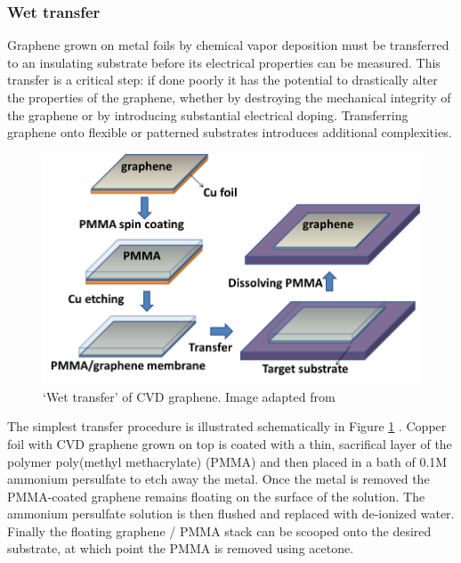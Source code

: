 \documentclass[edeposit,fullpage,draftthesis]{uiucthesis2009}
\begin{document}
            \subsubsection{Wet transfer}
            
            Graphene grown on metal foils by chemical vapor deposition must be transferred to 
        an insulating substrate before its electrical properties can be measured.
        This transfer is a critical step: if done poorly it has the potential to 
        drastically alter the properties of the graphene, whether by destroying
        the mechanical integrity of the graphene or by introducing substantial electrical doping.
        Transferring graphene onto flexible or patterned substrates introduces additional
        complexities. 
        
        \begin{figure}
            \centering
            \includegraphics[width=0.8\linewidth]{images/experimentaltechniques/wettransfer.png}
            \caption[Mechanical exfoliation of graphene]{
                `Wet transfer' of CVD graphene.
                Image adapted from \cite{kumar2013synthesis}}
            \label{fig:wettransfer}
        \end{figure}

        The simplest transfer procedure is illustrated schematically in Figure \ref{fig:wettransfer} \cite{reina2008large, kim2009large, li2009large}.
        Copper foil with CVD graphene grown on top is coated with a thin, sacrifical layer of the 
        polymer poly(methyl methacrylate) (PMMA) and then placed in a bath of 0.1M ammonium persulfate
        to etch away the metal. Once the metal is removed the PMMA-coated graphene 
        remains floating on the surface of the solution. The ammonium persulfate solution is then flushed and replaced
        with de-ionized water.
        Finally the floating graphene / PMMA stack can be
        scooped onto the desired substrate, at which point the PMMA is removed using acetone.
        
\end{document}
